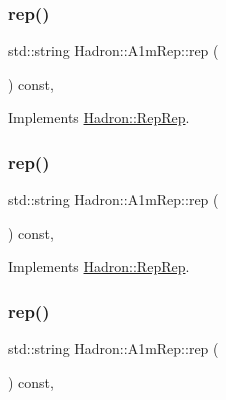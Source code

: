 \subsubsection{\texorpdfstring{rep()}{rep()}\hspace{0.1cm}{\footnotesize\ttfamily [1/3]}}
{\footnotesize\ttfamily std\+::string Hadron\+::\+A1m\+Rep\+::rep (\begin{DoxyParamCaption}{ }\end{DoxyParamCaption}) const\hspace{0.3cm}{\ttfamily [inline]}, {\ttfamily [virtual]}}



Implements \mbox{\hyperlink{structHadron_1_1RepRep_ab3213025f6de249f7095892109575fde}{Hadron\+::\+Rep\+Rep}}.

\mbox{\label{structHadron_1_1A1mRep_a99e7f10bdf161f356d1061172d776f41}} 
\subsubsection{\texorpdfstring{rep()}{rep()}\hspace{0.1cm}{\footnotesize\ttfamily [2/3]}}
{\footnotesize\ttfamily std\+::string Hadron\+::\+A1m\+Rep\+::rep (\begin{DoxyParamCaption}{ }\end{DoxyParamCaption}) const\hspace{0.3cm}{\ttfamily [inline]}, {\ttfamily [virtual]}}



Implements \mbox{\hyperlink{structHadron_1_1RepRep_ab3213025f6de249f7095892109575fde}{Hadron\+::\+Rep\+Rep}}.

\mbox{\label{structHadron_1_1A1mRep_a99e7f10bdf161f356d1061172d776f41}} 
\subsubsection{\texorpdfstring{rep()}{rep()}\hspace{0.1cm}{\footnotesize\ttfamily [3/3]}}
{\footnotesize\ttfamily std\+::string Hadron\+::\+A1m\+Rep\+::rep (\begin{DoxyParamCaption}{ }\end{DoxyParamCaption}) const\hspace{0.3cm}{\ttfamily [inline]}, {\ttfamily [virtual]}}



